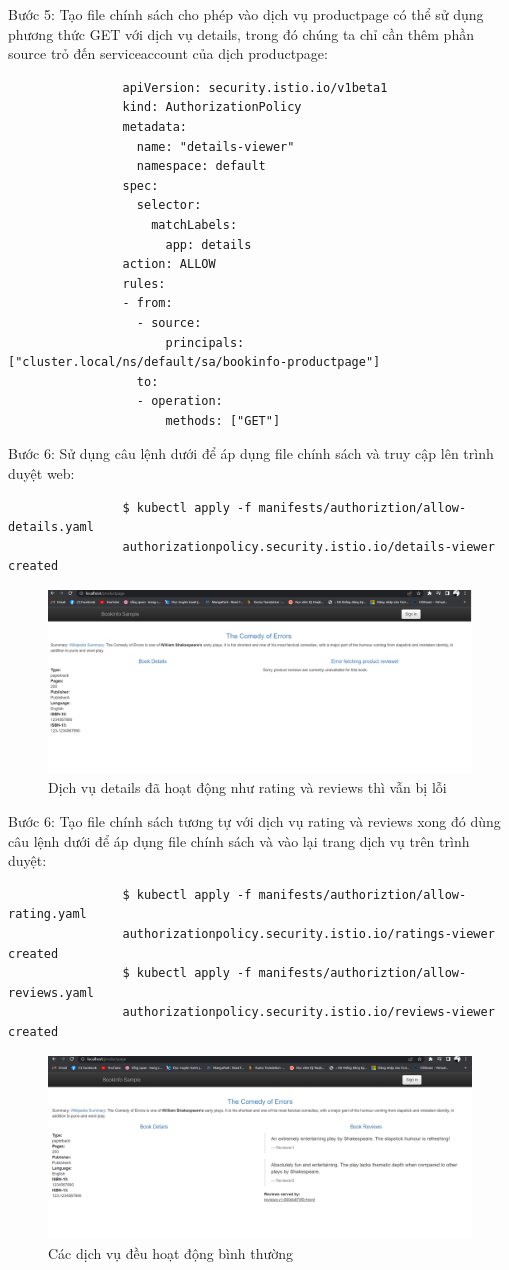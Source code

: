 \documentclass[12pt,a4paper]{report}
\begin{document}
{{				Bước 5: Tạo file chính sách cho phép vào dịch vụ productpage có thể sử dụng phương thức GET với dịch vụ details, trong đó chúng ta chỉ cần thêm phần source trỏ đến serviceaccount của dịch productpage:
				\begin{lstlisting}
				apiVersion: security.istio.io/v1beta1
				kind: AuthorizationPolicy
				metadata:
				  name: "details-viewer"
				  namespace: default
				spec:
				  selector:
				    matchLabels:
				      app: details
				action: ALLOW
				rules:
				- from:
				  - source:
				      principals: ["cluster.local/ns/default/sa/bookinfo-productpage"]
				  to:
				  - operation:
				      methods: ["GET"]
				\end{lstlisting}
			 	
			 	Bước 6: Sử dụng câu lệnh dưới để áp dụng file chính sách và truy cập lên trình duyệt web:
			 	\begin{lstlisting}
			 	$ kubectl apply -f manifests/authoriztion/allow-details.yaml 
			 	authorizationpolicy.security.istio.io/details-viewer created
			 	\end{lstlisting}
		 		\pagebreak
				\begin{figure}[h]
					\centering
					\includegraphics[width=0.7\linewidth]{Pics/3.3.2-p3}
					\caption{Dịch vụ details đã hoạt động như rating và reviews thì vẫn bị lỗi}
					\label{fig:3}
				\end{figure}
				
				Bước 6: Tạo file chính sách tương tự với dịch vụ rating và reviews xong đó dùng câu lệnh dưới để áp dụng file chính sách và vào lại trang dịch vụ trên trình duyệt:
				\begin{lstlisting}
				$ kubectl apply -f manifests/authoriztion/allow-rating.yaml 
				authorizationpolicy.security.istio.io/ratings-viewer created
				$ kubectl apply -f manifests/authoriztion/allow-reviews.yaml 
				authorizationpolicy.security.istio.io/reviews-viewer created
				\end{lstlisting}
				\begin{figure}[h]
					\centering
					\includegraphics[width=0.7\linewidth]{Pics/3.3.2-p4}
					\caption{Các dịch vụ đều hoạt động bình thường}
					\label{fig:3}
				\end{figure}
}}
\end{document}
